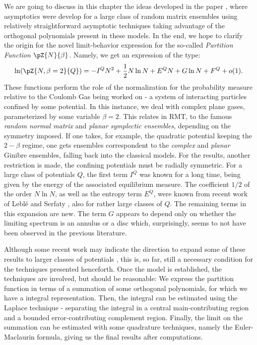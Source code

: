 We are going to discuss in this chapter the ideas developed in the paper \cite{Byun_2023}, where asymptotics were develop for a large class of random matrix ensembles using relatively straightforward asymptotic techniques taking advantage of the orthogonal polynomials present in these models. In the end, we hope to clarify the origin for the novel limit-behavior expression for the so-called \textit{Partition Function} $\pZ{N}{\beta}$. Namely, we get an expression of the type: 
\begin{equation}
	\ln(\pZ{N, \beta=2}{Q}) = -I^Q N^2+\frac{1}{2} N\ln N+E^Q N+G\ln N+F^Q + o(1).
\end{equation}
These functions perform the role of the normalization for the probability measure relative to the Coulomb Gas being worked on - a system of interacting particles confined by some potential. In this instance, we deal with complex plane gases, parameterized by some variable $\beta = 2$. This relates in RMT, to the famous \textit{random normal matrix} and \textit{planar symplectic ensembles}, depending on the symmetry imposed. If one takes, for example, the quadratic potential keeping the $2-\beta$ regime, one gets ensembles correspondent to the \textit{complex} and \textit{planar} Ginibre ensembles, falling back into the classical models. For the results, another restriction is made, the confining potentials must be radially symmetric. For a large class of potentials $Q$, the first term $I^Q$ was known for a long time, being given by the energy of the associated equilibrium measure. The coefficient $1/2$ of the order $N\ln N$, as well as the entropy term $E^Q$, were known from recent work of Leblé and Serfaty \cite{Leble2017-yj}, also for rather large classes of $Q$. The remaining terms in this expansion are new. The term $G$ appears to depend only on whether the limiting spectrum is an annulus or a disc which, surprisingly, seems to not have been observed in the previous literature. 

Although some recent work may indicate the direction to expand some of these results to larger classes of potentials \cite{hedenmalm2020planarorthogonalpolynomialsboundary}, this is, so far, still a necessary condition for the techniques presented henceforth.  Once the model is established, the techniques are involved, but should be reasonable: We express the partition function in terms of a summation of some orthogonal polynomials, for which we have a integral representation. Then, the integral can be estimated using the Laplace technique - separating the integral in a central main-contributing region and a bounded error-contributing complement region. Finally, the limit on the summation can be estimated with some quadrature techniques, namely the Euler-Maclaurin formula, giving us the final results after computations.

